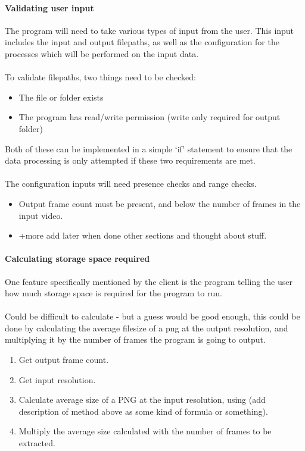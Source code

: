 \documentclass[11pt]{report}
\begin{document}
\paragraph{Validating user input}
The program will need to take various types of input from the user. This input includes the input and output filepaths, as well as the configuration for the processes which will be performed on the input data.\\\\
To validate filepaths, two things need to be checked:
\begin{itemize}
\item The file or folder exists
\item The program has read/write permission (write only required for output folder)
\end{itemize}
Both of these can be implemented in a simple `if' statement to ensure that the data processing is only attempted if these two requirements are met.\\\\
The configuration inputs will need presence checks and range checks.
\begin{itemize}
\item Output frame count must be present, and below the number of frames in the input video.
\item +more add later when done other sections and thought about stuff.
\end{itemize}

\paragraph{Calculating storage space required}
One feature specifically mentioned by the client is the program telling the user how much storage space is required for the program to run.\\\\
Could be difficult to calculate - but a guess would be good enough, this could be done by calculating the average filesize of a png at the output resolution, and multiplying it by the number of frames the program is going to output.
\begin{enumerate}
\item Get output frame count.
\item Get input resolution.
\item Calculate average size of a PNG at the input resolution, using (add description of method above as some kind of formula or something).
\item Multiply the average size calculated with the number of frames to be extracted.
\end{enumerate}
\end{document}
